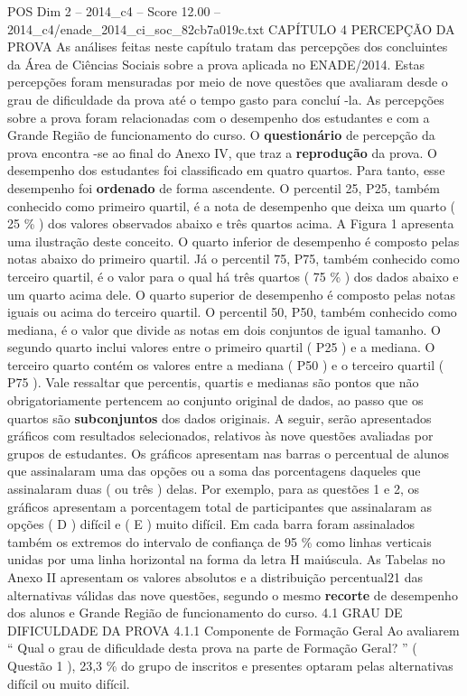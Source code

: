 \begin{textsample}{POS Dim 2 – 2014\_c4 – Score 12.00 – 2014\_c4/enade\_2014\_ci\_soc\_82cb7a019c.txt}  \label{ex:f2_pos_114}
CAPÍTULO 4 PERCEPÇÃO DA PROVA As análises feitas neste capítulo tratam das percepções dos concluintes da Área de Ciências Sociais sobre a prova aplicada no ENADE/2014.
Estas percepções foram mensuradas por meio de nove questões que avaliaram desde o grau de dificuldade da prova até o tempo gasto para concluí -la.
As percepções sobre a prova foram relacionadas com o desempenho dos estudantes e com a Grande Região de funcionamento do curso.
O \textbf{questionário} de percepção da prova encontra -se ao final do Anexo IV, que traz a \textbf{reprodução} da prova.
O desempenho dos estudantes foi classificado em quatro quartos.
Para tanto, esse desempenho foi \textbf{ordenado} de forma ascendente.
O percentil 25, P25, também conhecido como primeiro quartil, é a nota de desempenho que deixa um quarto ( 25 \% ) dos valores observados abaixo e três quartos acima.
A Figura 1 apresenta uma ilustração deste conceito.
O quarto inferior de desempenho é composto pelas notas abaixo do primeiro quartil.
Já o percentil 75, P75, também conhecido como terceiro quartil, é o valor para o qual há três quartos ( 75 \% ) dos dados abaixo e um quarto acima dele.
O quarto superior de desempenho é composto pelas notas iguais ou acima do terceiro quartil.
O percentil 50, P50, também conhecido como mediana, é o valor que divide as notas em dois conjuntos de igual tamanho.
O segundo quarto inclui valores entre o primeiro quartil ( P25 ) e a mediana.
O terceiro quarto contém os valores entre a mediana ( P50 ) e o terceiro quartil ( P75 ).
Vale ressaltar que percentis, quartis e medianas são pontos que não obrigatoriamente pertencem ao conjunto original de dados, ao passo que os quartos são \textbf{subconjuntos} dos dados originais.
A seguir, serão apresentados gráficos com resultados selecionados, relativos às nove questões avaliadas por grupos de estudantes.
Os gráficos apresentam nas barras o percentual de alunos que assinalaram uma das opções ou a soma das porcentagens daqueles que assinalaram duas ( ou três ) delas.
Por exemplo, para as questões 1 e 2, os gráficos apresentam a porcentagem total de participantes que assinalaram as opções ( D ) difícil e ( E ) muito difícil.
Em cada barra foram assinalados também os extremos do intervalo de confiança de 95 \% como linhas verticais unidas por uma linha horizontal na forma da letra H maiúscula.
As Tabelas no Anexo II apresentam os valores absolutos e a distribuição percentual21 das alternativas válidas das nove questões, segundo o mesmo \textbf{recorte} de desempenho dos alunos e Grande Região de funcionamento do curso. 4.1 GRAU DE DIFICULDADE DA PROVA 4.1.1 Componente de Formação Geral Ao avaliarem “ Qual o grau de dificuldade desta prova na parte de Formação Geral? ” ( Questão 1 ), 23,3 \% do grupo de inscritos e presentes optaram pelas alternativas difícil ou muito difícil.

\end{textsample}
